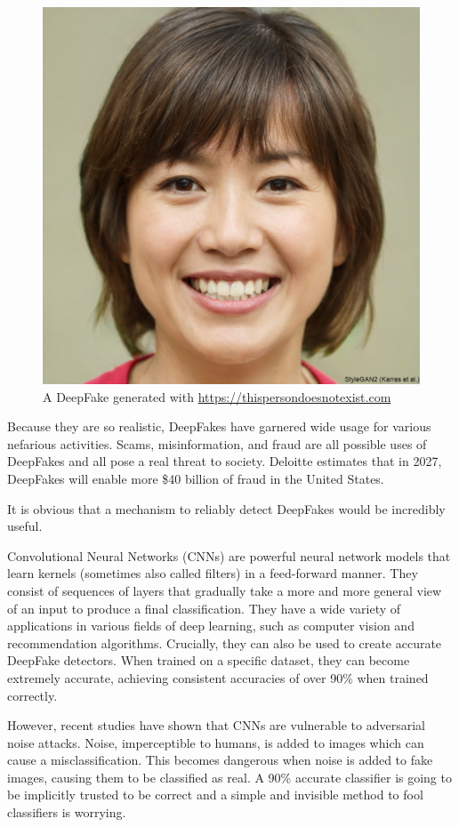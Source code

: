 \begin{figure}[h]
    \centering
    \includegraphics[width=0.5\linewidth]{dissertation//figures/thispersondoesnotexist.jpg}
    \caption{A DeepFake generated with \url{https://thispersondoesnotexist.com}}
    \label{fig:thispersondoesnotexist}
\end{figure}

Because they are so realistic, DeepFakes have garnered wide usage for various nefarious activities. Scams, misinformation, and fraud are all possible uses of DeepFakes and all pose a real threat to society\cite{sensity2024state}. Deloitte estimates that in 2027, DeepFakes will enable more \$40 billion of fraud in the United States\cite{lalchand2024generative}.

It is obvious that a mechanism to reliably detect DeepFakes would be incredibly useful.

Convolutional Neural Networks (CNNs) are powerful neural network models that learn kernels (sometimes also called filters) in a feed-forward manner\cite{lecun2015deep}. They consist of sequences of layers that gradually take a more and more general view of an input to produce a final classification. They have a wide variety of applications in various fields of deep learning, such as computer vision and recommendation algorithms. Crucially, they can also be used to create accurate DeepFake detectors. When trained on a specific dataset, they can become extremely accurate, achieving consistent accuracies of over 90\% when trained correctly\cite{papersiwthcodedeepfakedetection}.

However, recent studies have shown that CNNs are vulnerable to adversarial noise attacks. Noise, imperceptible to humans, is added to images which can cause a misclassification\cite{gandhi2020adversarial}. This becomes dangerous when noise is added to fake images, causing them to be classified as real. A 90\% accurate classifier is going to be implicitly trusted to be correct and a simple and invisible method to fool classifiers is worrying.

